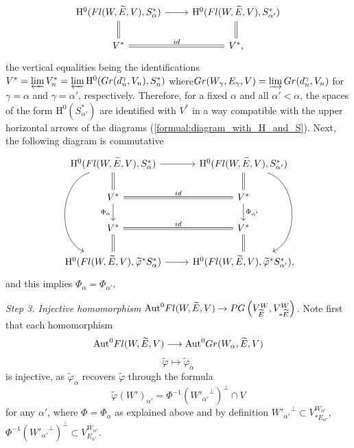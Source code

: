 \documentclass[11pt, a4paper]{article}
\begin{document}
\begin{equation}\label{formual:diagram_with_H_and_S}
    \begin{tikzcd}
\mathrm{H}^0(\Fl(W,\widetilde{E},V),S^*_{\alpha}) \arrow[d,equal] \arrow{r}
& \mathrm{H}^0(\Fl(W,\widetilde{E},V),S^*_{\alpha'}) \arrow[d,equal] \\
V^* \arrow[r,equal,"id"]
& V^*,
\end{tikzcd}
\end{equation}
the vertical equalities being the identifications $V^*=\varprojlim V^*_n=\varprojlim \mathrm{H}^0(Gr(d^{\gamma}_n,V_n),S^*_n)$ where\linebreak $Gr(W_{\gamma},E_{\gamma},V)=\varinjlim Gr(d^{\gamma}_n,V_n)$ for $\gamma=\alpha$ and $\gamma=\alpha'$, respectively.
Therefore, for a fixed $\alpha$ and all $\alpha'<\alpha$, the spaces of the form $\mathrm{H}^0(S^*_{\alpha'})$ are identified with $V^*$ in a way compatible with the upper horizontal arrows of the diagrams (\ref{formual:diagram_with_H_and_S}). Next, the following diagram is commutative
\begin{equation*}
    \begin{tikzcd}
    \mathrm{H}^0(\Fl(W,\widetilde{E},V),S^*_{\alpha}) \arrow[d,equal] \arrow{r}
\arrow[bend right = 70]{ddd} & \mathrm{H}^0(\Fl(W,\widetilde{E},V),S^*_{\alpha'})  \arrow[bend left=70]{ddd} \arrow[d,equal] \\
V^* \arrow[r,equal,"id"] \arrow[d, "\Phi_{\alpha}"']
& V^* \arrow[d,"\Phi_{\alpha'}"]\\
V^* \arrow[r,equal,"id"] \arrow[d,equal]
& V^* \arrow[d,equal] \\
\mathrm{H}^0(\Fl(W,\widetilde{E},V),\widetilde{\varphi}^*S^*_{\alpha})  \arrow{r}
& \mathrm{H}^0(\Fl(W,\widetilde{E},V),\widetilde{\varphi}^* S^*_{\alpha'}), 
    \end{tikzcd}
\end{equation*}
and this implies $\Phi_{\alpha}=\Phi_{\alpha'}$.

\emph{Step 3. Injective homomorphism $\mathrm{Aut}^0 Fl(W,\widetilde{E},V)\rightarrow P G\left(V^W_{\widetilde{E}},V^W_{*\widetilde{E}}\right)$.} Note first that each homomorphism \begin{equation*}
    \mathrm{Aut}^0 Fl(W,\widetilde{E},V) \longrightarrow \mathrm{Aut}^0 Gr(W_{\alpha},\widetilde{E},V)
    \end{equation*}
    \begin{equation*}\widetilde{\varphi}\longmapsto \widetilde{\varphi}_{\alpha}
\end{equation*}
is injective, as $\widetilde{\varphi}_{\alpha}$ recovers $\widetilde{\varphi}$ through the formula \begin{equation*}
    \widetilde{\varphi}\left(W'\right)_{\alpha'}=\Phi^{-1}\left({W'_{\alpha'}}^{\perp} \right)^{\perp}\cap V
\end{equation*}
for any $\alpha'$, where $\Phi=\Phi_{\alpha}$ as explained above and by definition ${W'_{\alpha'}}^{\perp}\subset V^{W_{\alpha'}}_{*E_{\alpha'}}$, $\Phi^{-1}\left({W'_{\alpha'}}^{\perp} \right)^{\perp} \subset V^{W_{\alpha'}}_{E_{\alpha'}}$. %
\end{document}
